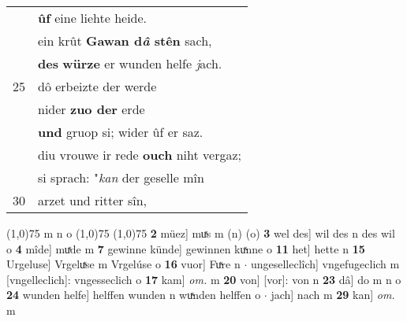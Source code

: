 \documentclass[8pt,a4paper,notitlepage]{article}
\begin{document}
\begin{table}[ht]
\begin{minipage}[t]{0.5\linewidth}
\begin{tabular}{rl}
 & \textbf{ûf} eine liehte heide.\\ 
 & ein krût \textbf{Gawan d\textit{â} stên} sach,\\ 
 & \textbf{des} \textbf{würze} er wunden helfe \textit{j}ach.\\ 
25 & dô erbeizte der werde\\ 
 & nider \textbf{zuo der} erde\\ 
 & \textbf{und} gruop si; wider ûf er saz.\\ 
 & diu vrouwe ir rede \textbf{ouch} niht vergaz;\\ 
 & si sprach: "\textit{kan} der geselle mîn\\ 
30 & arzet und ritter sîn,\\ 
\end{tabular}
\scriptsize
\line(1,0){75} \newline
m n o \newline
\line(1,0){75} \newline
\newline
\line(1,0){75} \newline
\textbf{2} müez] muͯs m (n) (o) \textbf{3} wel des] wil des n des wil o \textbf{4} mîde] muͯde m \textbf{7} gewinne künde] gewinnen kuͯnne o \textbf{11} het] hette n \textbf{15} Urgeluse] Vrgeluͯse m Vrgelúse o \textbf{16} vuor] Fuͯre n  $\cdot$ ungeselleclîch] vngefugeclich m [vngelleclich]: vngesseclich o \textbf{17} kam] \textit{om.} m \textbf{20} von] [vor]: von n \textbf{23} dâ] do m n o \textbf{24} wunden helfe] helffen wunden n wuͯnden helffen o  $\cdot$ jach] nach m \textbf{29} kan] \textit{om.} m \newline
\end{minipage}
\end{table}
\newpage
\end{document}

